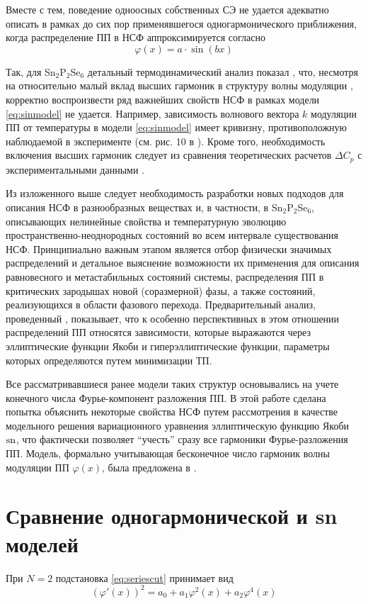 Вместе с тем, поведение одноосных собственных СЭ не удается адекватно описать в рамках до сих пор применявшегося одногармонического приближения, когда распределение ПП в НСФ аппроксимируется согласно
\begin{equation}
\varphi(x) = a \cdot \sin(bx)
\label{eq:sinmodel}
\end{equation}

Так, для Sn$_2$P$_2$Se$_6$ детальный термодинамический анализ показал \cite{Khoma1998}, что, несмотря на относительно малый вклад высших гармоник в структуру волны модуляции \cite{Barsamian1993}, корректно воспроизвести ряд важнейших свойств НСФ в рамках модели \eqref{eq:sinmodel} не удается. 
Например, зависимость волнового вектора $k$ модуляции ПП от температуры в модели \eqref{eq:sinmodel} имеет кривизну, противоположную наблюдаемой в эксперименте (см. рис. 10 в \cite{Khoma1998}). 
Кроме того, необходимость включения высших гармоник следует из сравнения теоретических расчетов $\Delta C_p$ с экспериментальными данными \cite{Khoma1998}.

Из изложенного выше следует необходимость разработки новых подходов для описания НСФ в разнообразных веществах и, в частности, в Sn$_2$P$_2$Se$_6$, описывающих нелинейные свойства и температурную эволюцию пространственно-неоднородных состояний во всем интервале существования НСФ. 
Принципиально важным этапом является отбор физически значимых распределений и детальное выяснение возможности их применения для описания равновесного и метастабильных состояний системы, распределения ПП в критических зародышах новой (соразмерной) фазы, а также состояний, реализующихся в области фазового перехода. 
Предварительный анализ, проведенный \cite{Barsamian1993}, показывает, что к особенно перспективных в этом отношении распределений ПП относятся зависимости, которые выражаются через эллиптические функции Якоби и гиперэллиптические функции, параметры которых определяются путем минимизации ТП.

Все рассматривавшиеся ранее модели таких структур основывались на учете конечного числа Фурье-компонент разложения ПП. 
В этой работе сделана попытка объяснить некоторые свойства НСФ путем рассмотрения в качестве модельного решения вариационного уравнения эллиптическую функцию Якоби $\operatorname{sn}$, что фактически позволяет ``учесть'' сразу все гармоники Фурье-разложения ПП. 
Модель, формально учитывающая бесконечное число гармоник волны модуляции ПП $\varphi(x)$, была предложена в \cite{Berezovsky1998}.

\section{Сравнение одногармонической и sn моделей}\label{sec:compare}
При $N=2$ подстановка \eqref{eq:seriescut} принимает вид
\begin{equation}
\left(\varphi'(x)\right)^2 = a_0 + a_1\varphi^2(x) + a_2\varphi^4(x)
\end{equation}

